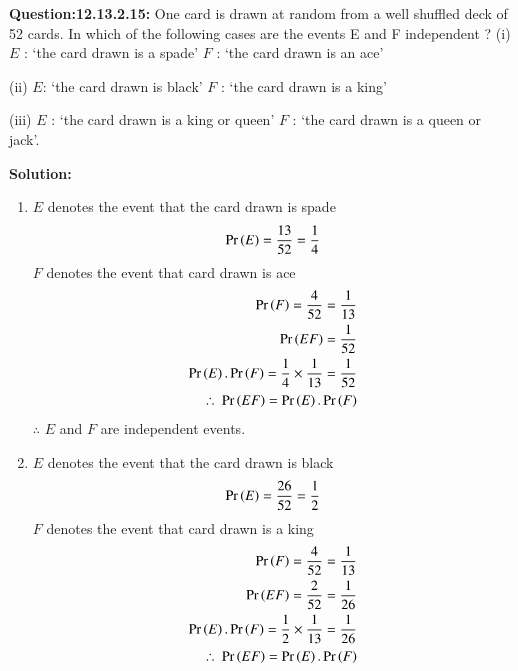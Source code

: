 \documentclass[12pt, journal]{IEEEtran}
\begin{document}
		\maketitle
		\textbf{Question:12.13.2.15:}
		One card is drawn at random from a well shuffled deck of 52 cards. In which of
		the following cases are the events E and F independent ?
			(i) $E$ : ‘the card drawn is a spade’
			$F$ : ‘the card drawn is an ace’
		
			(ii) $E$: ‘the card drawn is black’
			$F$ : ‘the card drawn is a king’
		
			(iii) $E$ : ‘the card drawn is a king or queen’
			$F$ : ‘the card drawn is a queen or jack’.
	
	\textbf{Solution:}

	\begin{enumerate}[label=(\roman*)]
		\item 
			$E$ denotes the event that the card drawn is spade
			\begin{align}
				\Pr\left(E\right) = \frac{13}{52} = \frac{1}{4} 
			\end{align}
			$F$ denotes the event that card drawn is ace 
			\begin{align}
				\Pr\left(F\right) = \frac{4}{52} = \frac{1}{13}\\
				\Pr\left(EF\right) = \frac{1}{52}\\
				\Pr\left(E\right).\Pr\left(F\right) = \frac{1}{4} \times \frac{1}{13} = \frac{1}{52}\\
				\therefore~\Pr\left(EF\right) = \Pr\left(E\right).\Pr\left(F\right)
			\end{align}
			$\therefore$  $E$ and $F$ are independent events. \\
		\item
			$E$ denotes the event that the card drawn is black 
			\begin{align}
				\Pr\left(E\right) = \frac{26}{52} = \frac{1}{2}
			\end{align}
			$F$ denotes the event that card drawn is a king 
			\begin{align}
				\Pr\left(F\right) = \frac{4}{52} = \frac{1}{13} \\
				\Pr\left(EF\right) = \frac{2}{52} = \frac{1}{26} \\
				\Pr\left(E\right).\Pr\left(F\right) = \frac{1}{2} \times \frac{1}{13} = \frac{1}{26}\\
				\therefore~\Pr\left(EF\right) = \Pr\left(E\right).\Pr\left(F\right)
			\end{align}
			

\end{enumerate}
\end{document}
